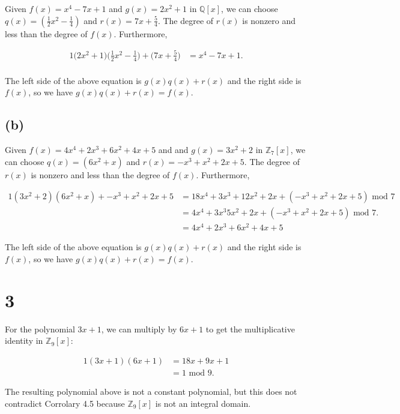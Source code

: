 \documentclass{article}
\begin{document}
Given $f(x) = x^4 - 7x + 1$ and $g(x) = 2x^2 + 1$ in $\mathbb{Q}[x]$, we can choose 
$q(x) = (\frac{1}{2}x^2 - \frac{1}{4})$ and $r(x) = 7x + \frac{5}{4}$.  The degree of 
$r(x)$ is nonzero and less than the degree of $f(x)$.  Furthermore,  

\begin{alignat*}{1}
    \bigg(2x^2 + 1\bigg)\bigg(\frac{1}{2}x^2 - \frac{1}{4}\bigg) + \bigg(7x + \frac{5}{4}\bigg) &= x^4 - 7x + 1. \\ 
\end{alignat*}

The left side of the above equation is $g(x)q(x) + r(x)$ and the right side is 
$f(x)$, so we have $g(x)q(x) + r(x) = f(x)$.

\subsection*{(b)} 

Given $f(x) = 4x^4 + 2x^3 + 6x^2 + 4x + 5$ and and $g(x) = 3x^2 + 2$ in $\mathbb{Z}_7 [x]$, we can choose 
$q(x) = (6x^2 + x)$ and $r(x) = -x^3 + x^2 + 2x + 5$.  The degree of 
$r(x)$ is nonzero and less than the degree of $f(x)$.  Furthermore, 

\begin{alignat*}{1}
    (3x^2 + 2)(6x^2 + x) + -x^3 + x^2 + 2x + 5 &= 18x^4 + 3x^3 + 12x^2 + 2x + (-x^3 + x^2 + 2x + 5) \textrm{ mod } 7 \\ 
    &= 4x^4 + 3x^3 5x^2 + 2x + (-x^3 + x^2 + 2x + 5) \textrm{ mod } 7. \\ 
    &= 4x^4 + 2x^3 + 6x^2 + 4x + 5
\end{alignat*}

The left side of the above equation is $g(x)q(x) + r(x)$ and the right side is 
$f(x)$, so we have $g(x)q(x) + r(x) = f(x)$.



\section*{3}

For the polynomial $3x + 1$, we can multiply by $6x+1$ to get the multiplicative 
identity in $\mathbb{Z}_9[x]$:

\begin{alignat*}{1}
    (3x+1)(6x+1) &= 18x + 9x + 1 \\
        &= 1 \textrm{ mod } 9.
\end{alignat*}

The resulting polynomial above is not a constant polynomial, but this does not contradict 
Corrolary 4.5 because $\mathbb{Z}_9[x]$ is not an integral domain.
\end{document}
